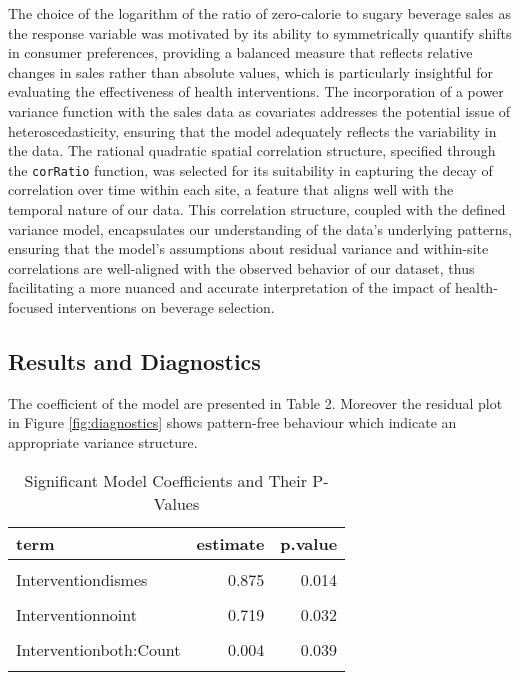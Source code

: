 \documentclass[
]{article}
\begin{document}
The choice of the logarithm of the ratio of zero-calorie to sugary beverage sales as the response variable was motivated by its ability to symmetrically quantify shifts in consumer preferences, providing a balanced measure that reflects relative changes in sales rather than absolute values, which is particularly insightful for evaluating the effectiveness of health interventions. The incorporation of a power variance function with the sales data as covariates addresses the potential issue of heteroscedasticity, ensuring that the model adequately reflects the variability in the data. The rational quadratic spatial correlation structure, specified through the \texttt{corRatio} function, was selected for its suitability in capturing the decay of correlation over time within each site, a feature that aligns well with the temporal nature of our data. This correlation structure, coupled with the defined variance model, encapsulates our understanding of the data's underlying patterns, ensuring that the model's assumptions about residual variance and within-site correlations are well-aligned with the observed behavior of our dataset, thus facilitating a more nuanced and accurate interpretation of the impact of health-focused interventions on beverage selection.

\hypertarget{results-and-diagnostics}{%
\subsection{Results and Diagnostics}\label{results-and-diagnostics}}

The coefficient of the model are presented in Table 2. Moreover the residual plot in Figure \ref{fig:diagnostics} shows pattern-free behaviour which indicate an appropriate variance structure.

\begin{table}

\caption{\label{tab:coefs}Significant Model Coefficients and Their P-Values}
\centering
\begin{tabular}[t]{lrr}
\toprule
term & estimate & p.value\\
\midrule
\cellcolor{gray!6}{Interventiondis} & \cellcolor{gray!6}{0.880} & \cellcolor{gray!6}{0.044}\\
Interventiondismes & 0.875 & 0.014\\
\cellcolor{gray!6}{Interventionexcer} & \cellcolor{gray!6}{1.792} & \cellcolor{gray!6}{0.001}\\
Interventionnoint & 0.719 & 0.032\\
\cellcolor{gray!6}{DofWWeekend} & \cellcolor{gray!6}{-0.087} & \cellcolor{gray!6}{0.000}\\
\addlinespace
Interventionboth:Count & 0.004 & 0.039\\
\cellcolor{gray!6}{Interventionexcer:Count} & \cellcolor{gray!6}{-0.007} & \cellcolor{gray!6}{0.008}\\
\bottomrule
\end{tabular}
\end{table}
\end{document}
